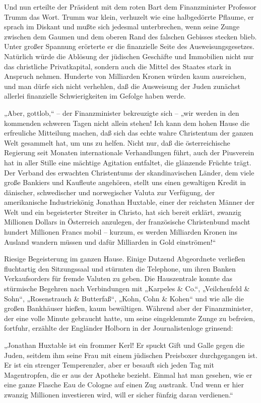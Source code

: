 Und nun erteilte der Präsident mit dem roten Bart dem
Finanzminister Professor Trumm das Wort. Trumm war klein, verhuzelt
wie eine halbgedörrte Pflaume, er sprach im Diskant und mußte sich
jedesmal unterbrechen, wenn seine Zunge zwischen dem Gaumen und dem
oberen Rand des falschen Gebisses stecken blieb. Unter großer
Spannung erörterte er die finanzielle Seite des
Ausweisungsgesetzes. Natürlich würde die Ablösung der jüdischen
Geschäfte und Immobilien nicht nur das christliche Privatkapital,
sondern auch die Mittel des Staates stark in Anspruch nehmen.
Hunderte von Milliarden Kronen würden kaum ausreichen, und man
dürfe sich nicht verhehlen, daß die Ausweisung der Juden zunächst
allerlei finanzielle Schwierigkeiten im Gefolge haben werde.

„Aber, gottlob,“ – der Finanzminister bekreuzigte sich – „wir
werden in den kommenden schweren Tagen nicht allein stehen! Ich
kann dem hohen Hause die erfreuliche Mitteilung machen, daß sich
das echte wahre Christentum der ganzen Welt gesammelt hat, um uns
zu helfen. Nicht nur, daß die österreichische Regierung seit
Monaten internationale Verhandlungen führt, auch der Piusverein hat
 in aller Stille eine mächtige Agitation entfaltet,
die glänzende Früchte trägt. Der Verband des erwachten Christentums
der skandinavischen Länder, dem viele große Bankiers und Kaufleute
angehören, stellt uns einen gewaltigen Kredit in dänischer,
schwedischer und norwegischer Valuta zur Verfügung, der
amerikanische Industriekönig Jonathan Huxtable, einer der reichsten
Männer der Welt und ein begeisterter Streiter in Christo, hat sich
bereit erklärt, zwanzig Millionen Dollars in Österreich anzulegen,
der französische Christenbund macht hundert Millionen Francs mobil
– kurzum, es werden Milliarden Kronen ins Ausland wandern müssen
und dafür Milliarden in Gold einströmen!“

Riesige Begeisterung im ganzen Hause. Einige Dutzend Abgeordnete
verließen fluchtartig den Sitzungssaal und stürmten die Telephone,
um ihren Banken Verkaufsorders für fremde Valuten zu geben. Die
Hauszentrale konnte das stürmische Begehren nach Verbindungen mit
„Karpeles \& Co.“, „Veilchenfeld \& Sohn“, „Rosenstrauch \&
Butterfaß“, „Kohn, Cohn \& Kohen“ und wie alle die großen
Bankhäuser hießen, kaum bewältigen. Während aber der
Finanzminister, der eine volle Minute gebraucht hatte, um seine
eingeklemmte Zunge zu befreien, fortfuhr, erzählte der Engländer
Holborn in der Journalistenloge grinsend:

„Jonathan Huxtable ist ein frommer Kerl! Er spuckt Gift und Galle
gegen die Juden, seitdem ihm seine Frau mit einem jüdischen
Preisboxer durchgegangen ist. Er ist ein strenger Temperenzler,
aber er besauft sich jeden Tag mit Magentropfen, die er aus der
Apotheke bezieht. Einmal  hat man gesehen, wie er
eine ganze Flasche Eau de Cologne auf einen Zug austrank. Und wenn
er hier zwanzig Millionen investieren wird, will er sicher fünfzig
daran verdienen.“

